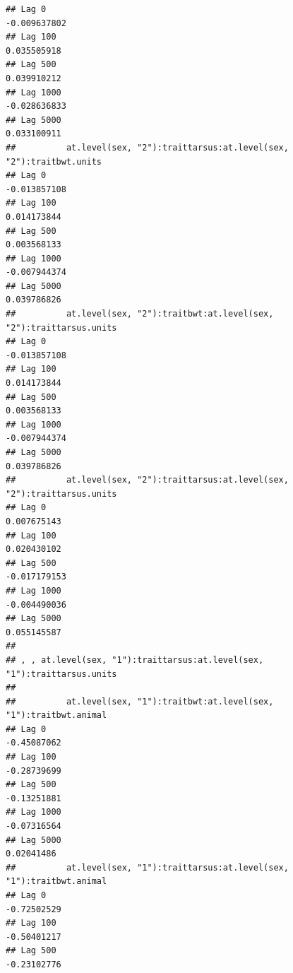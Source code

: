 \documentclass[
  12pt,
]{book}
\begin{document}
\begin{verbatim}
## Lag 0                                                     -0.009637802
## Lag 100                                                    0.035505918
## Lag 500                                                    0.039910212
## Lag 1000                                                  -0.028636833
## Lag 5000                                                   0.033100911
##          at.level(sex, "2"):traittarsus:at.level(sex, "2"):traitbwt.units
## Lag 0                                                        -0.013857108
## Lag 100                                                       0.014173844
## Lag 500                                                       0.003568133
## Lag 1000                                                     -0.007944374
## Lag 5000                                                      0.039786826
##          at.level(sex, "2"):traitbwt:at.level(sex, "2"):traittarsus.units
## Lag 0                                                        -0.013857108
## Lag 100                                                       0.014173844
## Lag 500                                                       0.003568133
## Lag 1000                                                     -0.007944374
## Lag 5000                                                      0.039786826
##          at.level(sex, "2"):traittarsus:at.level(sex, "2"):traittarsus.units
## Lag 0                                                            0.007675143
## Lag 100                                                          0.020430102
## Lag 500                                                         -0.017179153
## Lag 1000                                                        -0.004490036
## Lag 5000                                                         0.055145587
## 
## , , at.level(sex, "1"):traittarsus:at.level(sex, "1"):traittarsus.units
## 
##          at.level(sex, "1"):traitbwt:at.level(sex, "1"):traitbwt.animal
## Lag 0                                                       -0.45087062
## Lag 100                                                     -0.28739699
## Lag 500                                                     -0.13251881
## Lag 1000                                                    -0.07316564
## Lag 5000                                                     0.02041486
##          at.level(sex, "1"):traittarsus:at.level(sex, "1"):traitbwt.animal
## Lag 0                                                          -0.72502529
## Lag 100                                                        -0.50401217
## Lag 500                                                        -0.23102776

\end{verbatim}
\end{document}
